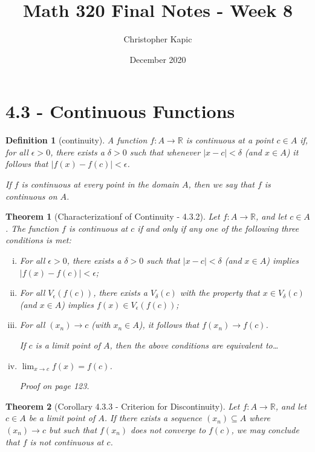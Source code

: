 \documentclass{article}
\title{Math 320 Final Notes - Week 8}
\author{Christopher Kapic}
\date{December 2020}
\newtheorem{definition}{Definition}
\newtheorem{theorem}{Theorem}
\begin{document}
\maketitle

\section*{4.3 - Continuous Functions}
\begin{definition}[continuity]
    A function $f:A\rightarrow \mathbb{R}$ is \textit{continuous} at a point $c\in A$ if, for all $\epsilon > 0$, there exists a $\delta > 0$ such that whenever $|x-c|<\delta$ (and $x \in A$) it follows that $|f(x)-f(c)| < \epsilon$.

    If $f$ is continuous at every point in the domain $A$, then we say that $f$ is \textit{continuous} on $A$.
\end{definition}

\begin{theorem}[Characterizationf of Continuity - 4.3.2]
    Let $f:A\rightarrow \mathbb{R}$, and let $c \in A$. The function $f$ is continuous at $c$ if and only if any one of the following three conditions is met:
    \begin{enumerate}[(i)]
        \item For all $\epsilon > 0$, there exists a $\delta > 0$ such that $|x - c| < \delta$ (and $x \in A$) implies $|f(x)-f(c)|<\epsilon$;
        \item For all $V_\epsilon (f(c))$, there exists a $V_\delta (c)$ with the property that $x \in V_\delta (c)$ (and $x \in A$) implies $f(x) \in V_\epsilon (f(c))$;
        \item For all $(x_n)\rightarrow c$ (with $x_n \in A$), it follows that $f(x_n) \rightarrow f(c)$.
        
        If $c$ is a limit point of $A$, then the above conditions are equivalent to\dots
        \item $\lim _{x \rightarrow c}f(x) = f(c)$.
        
        Proof on page 123.
    \end{enumerate}
\end{theorem}

\begin{theorem}[Corollary 4.3.3 - Criterion for Discontinuity]
    Let $f:A\rightarrow \mathbb{R}$, and let $c \in A$ be a limit point of $A$. If there exists a sequence $(x_n)\subseteq A$ where $(x_n)\rightarrow c$ but such that $f(x_n)$ does not converge to $f(c)$, we may conclude that $f$ is not continuous at $c$.
\end{theorem}
\end{document}
